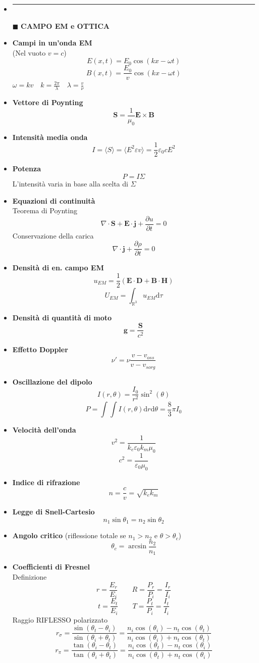 \documentclass{book}
\newcommand{\g}{\textbf}
\newcommand{\h}{\mathbf}
\newcommand{\e}{\begin{equation}}
\newcommand{\ex}{\end{equation} }
\renewcommand{\it}{\item[$\cdot$]}
\newcommand{\sep}{\item[]\rule{\linewidth}{0.4pt}}
\begin{document}
\begin{multicols}{4}
\begin{itemize}
\sep
\item [$\blacksquare$] \g{CAMPO EM e OTTICA}
    \it \g{Campi in un'onda EM} \\
        (Nel vuoto $v=c$)
        \e{E(x,t)=E_0\cos(kx-\omega t)} \ex
        \e{B(x,t)=\frac{E_0}{v}\cos(kx-\omega t)} \ex
        $\omega=kv \quad k=\frac{2\pi}{\lambda} \quad \lambda=\frac{v}{\nu}$ \\
    \it \g{Vettore di Poynting}
        \e{\h{S}=\frac{1}{\mu_0}\h{E}\times\h{B}} \ex
    \it \g{Intensità media onda}
        \e{I=\langle S\rangle=\langle E^2\varepsilon v\rangle = \frac{1}{2} \varepsilon_0 c E^2}\ex
    \it \g{Potenza}
        \e{P=I\Sigma} \ex
        L'intensità varia in base alla scelta di $\Sigma$ 
    \it \g{Equazioni di continuità} \\
        Teorema di Poynting
        \e{\nabla\cdot \h{S}+\h{E}\cdot\h{j}+\frac{\partial u}{\partial t}=0 } \ex
        Conservazione della carica
        \e{\nabla\cdot\h{j}+\frac{\partial \rho}{\partial t}=0} \ex
    \it \g{Densità di en. campo EM}
        \e{u_{EM}=\frac{1}{2}(\h{E}\cdot\h{D}+\h{B}\cdot\h{H})} \ex
        \e{U_{EM}=\int_{\mathbb{R}^3}u_{EM} \mathrm{d}\tau} \ex
    \it \g{Densità di quantità di moto}
        \e{\h{g}=\frac{\h{S}}{c^2}} \ex
    \it \g{Effetto Doppler}
        \e{\nu'=\nu\frac{v-v_{oss}}{v-v_{sorg}}} \ex
    \it \g{Oscillazione del dipolo}
        \e{I(r,\theta)=\frac{I_0}{r^2}\sin^2(\theta)} \ex
        \e{P=\int \int I(r,\theta) \mathrm{d}r \mathrm{d}\theta=\frac{8}{3}\pi I_0}\ex
    \it \g{Velocità dell'onda}
        \e{v^2=\frac{1}{k_e \varepsilon_0 k_m \mu_0}} \ex
        \e{c^2=\frac{1}{\varepsilon_0 \mu_0}} \ex
    \it \g{Indice di rifrazione}
        \e{n=\frac{c}{v}=\sqrt{k_ek_m}} \ex
    \it \g{Legge di Snell-Cartesio}
        \e{n_1 \sin\theta_1=n_2 \sin\theta_2} \ex
    \it \g{Angolo critico} (riflessione totale se $n_1>n_2$ e $\theta>\theta_c$)
        \e{\theta_c=\arcsin\frac{n_2}{n_1}} \ex
    \it \g{Coefficienti di Fresnel} \\
        Definizione
        \e{r=\frac{E_r}{E_i} \qquad R=\frac{P_r}{P_i}=\frac{I_r}{I_i}} \ex
        \e{t=\frac{E_t}{E_i} \qquad T=\frac{P_t}{P_i}=\frac{I_t}{I_i}} \ex
        Raggio RIFLESSO polarizzato
        \e{r_\sigma=\frac{\sin(\theta_t-\theta_i)}{\sin(\theta_i+\theta_t)}=
        \frac{n_i \cos(\theta_i) - n_t \cos(\theta_t)}{n_i \cos(\theta_i) + n_t \cos(\theta_t)}}\ex
        \e{r_\pi=\frac{\tan(\theta_i-\theta_t)}{\tan(\theta_i+\theta_t)}=
        \frac{n_i \cos(\theta_t) - n_t \cos(\theta_i)}{n_i \cos(\theta_t) + n_t \cos(\theta_i)}} \ex

\end{itemize}
\end{multicols}
\end{document}
